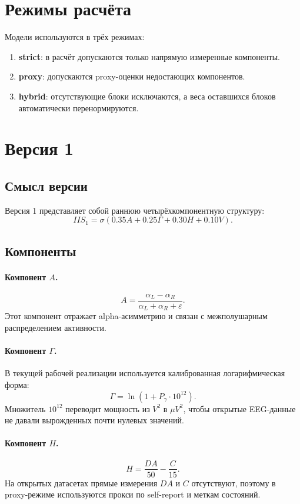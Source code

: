 \documentclass[12pt,a4paper]{article}
\begin{document}
\section{Режимы расчёта}
Модели используются в трёх режимах:
\begin{enumerate}[leftmargin=1.25cm]
    \item \textbf{strict}: в расчёт допускаются только напрямую измеренные компоненты.
    \item \textbf{proxy}: допускаются proxy-оценки недостающих компонентов.
    \item \textbf{hybrid}: отсутствующие блоки исключаются, а веса оставшихся блоков автоматически перенормируются.
\end{enumerate}

\section{Версия 1}
\subsection{Смысл версии}
Версия 1 представляет собой раннюю четырёхкомпонентную структуру:
\[
IIS_1 = \sigma\!\left(0.35A + 0.25\Gamma + 0.30H + 0.10V\right).
\]

\subsection{Компоненты}
\paragraph{Компонент $A$.}
\[
A = \frac{\alpha_L - \alpha_R}{\alpha_L + \alpha_R + \varepsilon}.
\]
Этот компонент отражает alpha-асимметрию и связан с межполушарным распределением активности.

\paragraph{Компонент $\Gamma$.}
В текущей рабочей реализации используется калиброванная логарифмическая форма:
\[
\Gamma = \ln\!\left(1 + P_\gamma \cdot 10^{12}\right).
\]
Множитель $10^{12}$ переводит мощность из $V^2$ в $\mu V^2$, чтобы открытые EEG-данные не давали вырожденных почти нулевых значений.

\paragraph{Компонент $H$.}
\[
H = \frac{DA}{50} - \frac{C}{15}.
\]
На открытых датасетах прямые измерения $DA$ и $C$ отсутствуют, поэтому в proxy-режиме используются прокси по self-report и меткам состояний.
\end{document}
